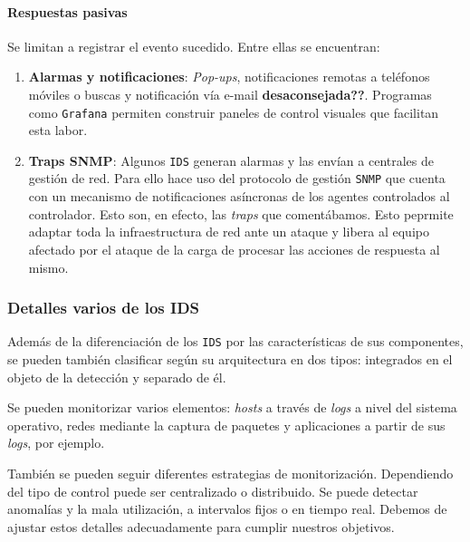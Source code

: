 \documentclass[12pt]{article}
\newcommand{\newpar} {
    \vskip 0.5cm
}
\begin{document}
                \paragraph{Respuestas pasivas}
                    Se limitan a registrar el evento sucedido. Entre ellas se encuentran:

                    \begin{enumerate}
                        \item \textbf{Alarmas y notificaciones}: \textit{Pop-ups}, notificaciones remotas a teléfonos móviles o buscas y notificación vía e-mail \textbf{desaconsejada??}. Programas como \texttt{Grafana} permiten construir paneles de control visuales que facilitan esta labor.
                        \item \textbf{Traps SNMP}: Algunos \texttt{IDS} generan alarmas y las envían a centrales de gestión de red. Para ello hace uso del protocolo de gestión \texttt{SNMP} que cuenta con un mecanismo de notificaciones asíncronas de los agentes controlados al controlador. Esto son, en efecto, las \textit{traps} que comentábamos. Esto peprmite adaptar toda la infraestructura de red ante un ataque y libera al equipo afectado por el ataque de la carga de procesar las acciones de respuesta al mismo.
                    \end{enumerate}

            \subsubsection{Detalles varios de los IDS}
                Además de la diferenciación de los \texttt{IDS} por las características de sus componentes, se pueden también clasificar según su arquitectura en dos tipos: integrados en el objeto de la detección y separado de él.

                \newpar

                Se pueden monitorizar varios elementos: \textit{hosts} a través de \textit{logs} a nivel del sistema operativo, redes mediante la captura de paquetes y aplicaciones a partir de sus \textit{logs}, por ejemplo.

                \newpar

                También se pueden seguir diferentes estrategias de monitorización. Dependiendo del tipo de control puede ser centralizado o distribuido. Se puede detectar anomalías y la mala utilización, a intervalos fijos o en tiempo real. Debemos de ajustar estos detalles adecuadamente para cumplir nuestros objetivos.
\end{document}
